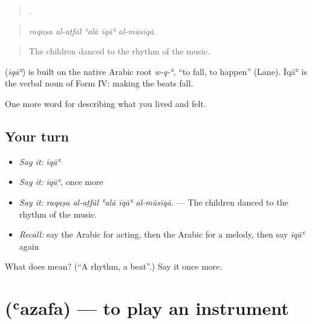 \begin{quote}
    .
\end{quote}

\begin{quote}
\emph{raqaṣa al-aṭfāl ʿalā īqāʿ al-mūsīqā.}
\end{quote}

\begin{quote}
The children danced to the rhythm of the music.
\end{quote}

\begin{cousinweb}
\textbf{} (\emph{īqāʿ}) is built on the native Arabic root \emph{w-q-ʿ}, \textquotedblleft{}to fall, to happen\textquotedblright{} (Lane). Īqāʿ is the verbal noun of Form IV: making the beats fall.
\end{cousinweb}

\begin{grammarlens}[title={What you've built}]
One more word for describing what you lived and felt.
\end{grammarlens}

\subsection*{Your turn}
\begin{itemize}
\raggedright
  \item \emph{Say it:} \emph{īqāʿ}
  \item \emph{Say it:} \emph{īqāʿ}, once more
  \item \emph{Say it:} \emph{raqaṣa al-aṭfāl ʿalā īqāʿ al-mūsīqā.} — The children danced to the rhythm of the music.
  \item \emph{Recall:} say the Arabic for acting, then the Arabic for a melody, then say \emph{īqāʿ} again
\end{itemize}

\begin{tcolorbox}[breakable,colback=teal!4,colframe=teal!35!black,title={Before you move on}]
What does  mean? (\textquotedblleft{}A rhythm, a beat\textquotedblright{}.) Say it once more.
\end{tcolorbox}
\section[\texorpdfstring{\ar{عزف} (ʿazafa)}{عزف (ʿazafa)}]{ (ʿazafa) — to play an instrument}

